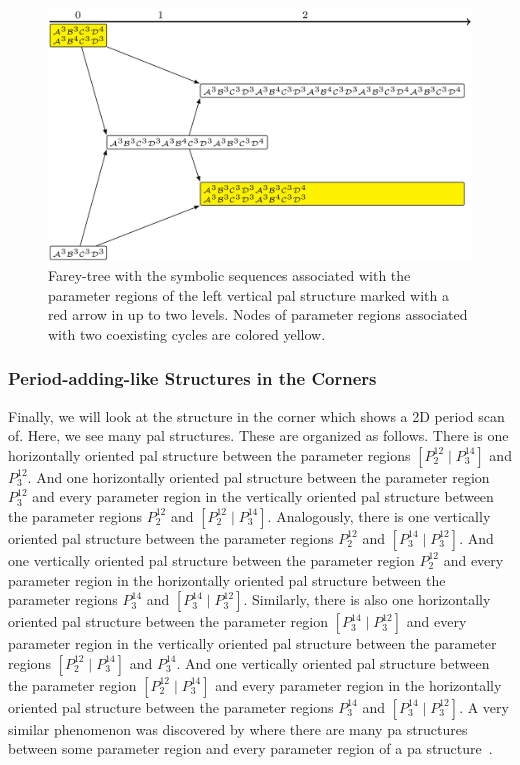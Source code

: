 \begin{figure}
	\centering
	\includegraphics[width=.7 \textwidth]{../Figures/7/7.15+17/adding.png}
	\caption[Farey-tree with the symbolic sequences of a horizontal  structure]{
		Farey-tree with the symbolic sequences associated with the parameter regions of the left vertical \gls{pal} structure marked with a red arrow in  up to two levels.
		Nodes of parameter regions associated with two coexisting cycles are colored yellow.
	}
	\label{fig:add.add.like.vert.tree}
\end{figure}

\subsubsection{Period-adding-like Structures in the Corners}

Finally, we will look at the structure in the corner which  shows a 2D period scan of.
Here, we see many \gls{pal} structures.
These are organized as follows.
There is one horizontally oriented \gls{pal} structure between the parameter regions $\left[P^{12}_2 \mid P^{14}_3\right]$ and $P^{12}_3$.
And one horizontally oriented \gls{pal} structure between the parameter region $P^{12}_3$ and every parameter region in the vertically oriented \gls{pal} structure between the parameter regions $P^{12}_2$ and $\left[P^{12}_2 \mid P^{14}_3\right]$.
Analogously, there is one vertically oriented \gls{pal} structure between the parameter regions $P^{12}_2$ and $\left[P^{14}_3 \mid P^{12}_3\right]$.
And one vertically oriented \gls{pal} structure between the parameter region $P^{12}_2$ and every parameter region in the horizontally oriented \gls{pal} structure between the parameter regions $P^{14}_3$ and $\left[P^{14}_3 \mid P^{12}_3\right]$.
Similarly, there is also one horizontally oriented \gls{pal} structure between the parameter region $\left[P^{14}_3 \mid P^{12}_3\right]$ and every parameter region in the vertically oriented \gls{pal} structure between the parameter regions $\left[P^{12}_2 \mid P^{14}_3\right]$ and $P^{14}_3$.
And one vertically oriented \gls{pal} structure between the parameter region $\left[P^{12}_2 \mid P^{14}_3\right]$ and every parameter region in the horizontally oriented \gls{pal} structure between the parameter regions $P^{14}_3$ and $\left[P^{14}_3 \mid P^{12}_3\right]$.
A very similar phenomenon was discovered by  where there are many \gls{pa} structures between some parameter region and every parameter region of a \gls{pa} structure~\cite{tramontana2012period}.

